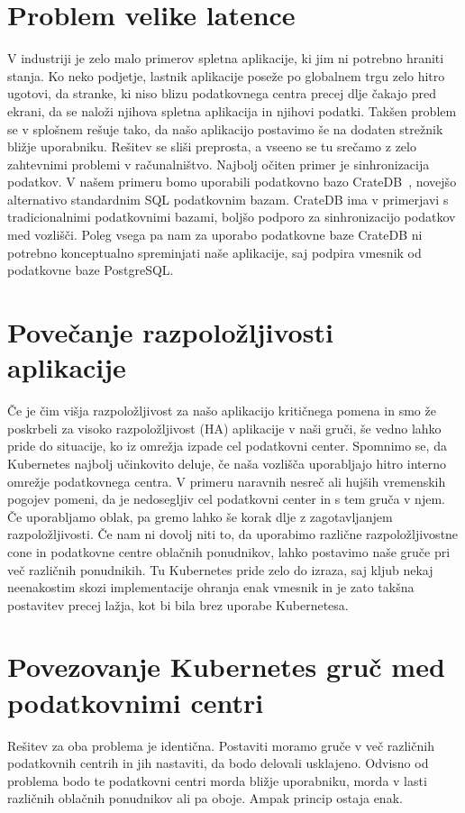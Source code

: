 \documentclass[a4paper, 12pt]{book}
\begin{document}
\section{Problem velike latence}
V industriji je zelo malo primerov spletna aplikacije, ki jim ni potrebno hraniti stanja. 
Ko neko podjetje, lastnik aplikacije poseže po globalnem trgu zelo hitro ugotovi, da stranke, ki niso blizu podatkovnega centra precej dlje čakajo pred ekrani, da se naloži njihova spletna aplikacija in njihovi podatki.
Takšen problem se v splošnem rešuje tako, da našo aplikacijo postavimo še na dodaten strežnik bližje uporabniku. 
Rešitev se sliši preprosta, a vseeno se tu srečamo z zelo zahtevnimi problemi v računalništvo.
Najbolj očiten primer je sinhronizacija podatkov.
V našem primeru bomo uporabili podatkovno bazo CrateDB~\cite{cratedb}, novejšo alternativo standardnim SQL podatkovnim bazam.
CrateDB ima v primerjavi s tradicionalnimi podatkovnimi bazami, boljšo podporo za sinhronizacijo podatkov med vozlišči.
Poleg vsega pa nam za uporabo podatkovne baze CrateDB ni potrebno konceptualno spreminjati naše aplikacije, saj podpira vmesnik od podatkovne baze PostgreSQL.
\section{Povečanje razpoložljivosti aplikacije}
Če je čim višja razpoložljivost za našo aplikacijo kritičnega pomena in smo že poskrbeli za visoko razpoložljivost (HA) aplikacije v naši gruči, še vedno lahko pride do situacije, ko iz omrežja izpade cel podatkovni center.
Spomnimo se, da Kubernetes najbolj učinkovito deluje, če naša vozlišča uporabljajo hitro interno omrežje podatkovnega centra.
V primeru naravnih nesreč ali hujših vremenskih pogojev pomeni, da je nedosegljiv cel podatkovni center in s tem gruča v njem.
Če uporabljamo oblak, pa gremo lahko še korak dlje z zagotavljanjem razpoložljivosti.
Če nam ni dovolj niti to, da uporabimo različne razpoložljivostne cone in podatkovne centre oblačnih ponudnikov, lahko postavimo naše gruče pri več različnih ponudnikih.
Tu Kubernetes pride zelo do izraza, saj kljub nekaj neenakostim skozi implementacije ohranja enak vmesnik in je zato takšna postavitev precej lažja, kot bi bila brez uporabe Kubernetesa.
\section{Povezovanje Kubernetes gruč med podatkovnimi centri}
Rešitev za oba problema je identična.
Postaviti moramo gruče v več različnih podatkovnih centrih in jih nastaviti, da bodo delovali usklajeno.
Odvisno od problema bodo te podatkovni centri morda bližje uporabniku, morda v lasti različnih oblačnih ponudnikov ali pa oboje.
Ampak princip ostaja enak.
\end{document}
